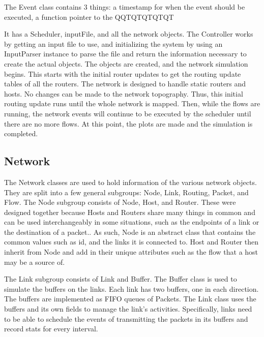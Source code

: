 \documentclass{article}
\begin{document}
The Event class contains 3 things: a timestamp for when the event should be executed, a function pointer to the QQTQTQTQTQT

It has a Scheduler, inputFile, and all the network objects. The Controller works by getting an input file to use, and initializing the system by using an InputParser instance to parse the file and return the information necessary to create the actual objects. The objects are created, and the network simulation begins. This starts with the initial router updates to get the routing update tables of all the routers. The network is designed to handle static routers and hosts. No changes can be made to the network topography. Thus, this initial routing update runs until the whole network is mapped. Then, while the flows are running, the network events will continue to be executed by the scheduler until there are no more flows. At this point, the plots are made and the simulation is completed.


\subsection{Network}

    The Network classes are used to hold information of the various network objects. They are split into a few general subgroups: Node, Link, Routing, Packet, and Flow.
The Node subgroup consists of Node, Host, and Router. These were designed together because Hosts and Routers share many things in common and can be used interchangeably in some situations, such as the endpoints of a link or the destination of a packet.. As such, Node is an abstract class that contains the common values such as id, and the links it is connected to. Host and Router then inherit from Node and add in their unique attributes such as the flow that a host may be a source of.

    The Link subgroup consists of Link and Buffer. The Buffer class is used to simulate the buffers on the links. Each link has two buffers, one in each direction. The buffers are implemented as FIFO queues of Packets. The Link class uses the buffers and its own fields to manage the link’s activities. Specifically, links need to be able to schedule the events of transmitting the packets in its buffers and record stats for every interval.
\end{document}
